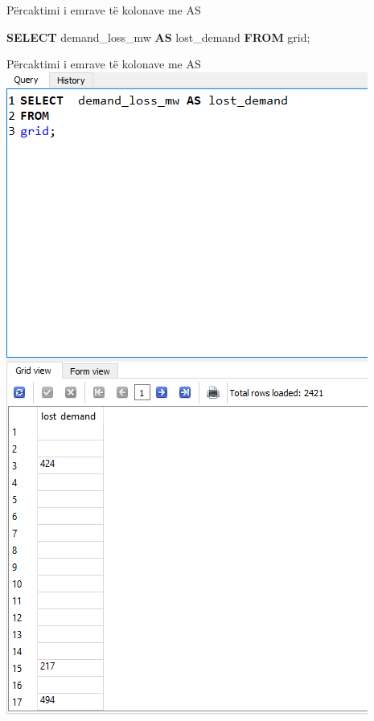 \documentclass[
  ignorenonframetext,
]{beamer}
\newenvironment{Shaded}{\begin{snugshade}}{\end{snugshade}}
\newcommand{\KeywordTok}[1]{\textcolor[rgb]{0.13,0.29,0.53}{\textbf{#1}}}
\newcommand{\NormalTok}[1]{#1}
\begin{document}
\begin{frame}[fragile]{Përcaktimi i emrave të kolonave me AS}
\label{puxebrcaktimi-i-emrave-tuxeb-kolonave-me-as}

\begin{Shaded}
\begin{Highlighting}[]
\KeywordTok{SELECT}\NormalTok{  demand\_loss\_mw }\KeywordTok{AS}\NormalTok{ lost\_demand}
\KeywordTok{FROM} 
\NormalTok{grid;}
\end{Highlighting}
\end{Shaded}
\end{frame}

\begin{frame}{Përcaktimi i emrave të kolonave me AS}
\label{puxebrcaktimi-i-emrave-tuxeb-kolonave-me-as-1}
\includegraphics{./Figs/sql21.png}
\end{frame}
\end{document}
